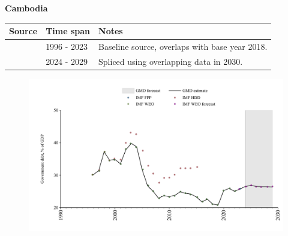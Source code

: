 \documentclass[12pt,a4paper,landscape]{article}
\begin{document}
\begin{adjustbox}{max totalsize={\paperwidth}{\paperheight},center}
\begin{minipage}[t][\textheight][t]{\textwidth}
\vspace*{0.5cm}
{}
\begin{center}
{\Large\bfseries Cambodia}
\end{center}
\vspace{0.5cm}
\begin{table}[H]
\centering
\small
\begin{tabular}{|l|l|l|}
\hline
\textbf{Source} & \textbf{Time span} & \textbf{Notes} \\
\hline
\rowcolor{white}\cite{IMF_FPP}& 1996 - 2023 &Baseline source, overlaps with base year 2018.\\
\rowcolor{lightgray}\cite{IMF_WEO_forecast}& 2024 - 2029 &Spliced using overlapping data in 2030.\\
\hline
\end{tabular}
\end{table}
\begin{figure}[H]
\centering
\includegraphics[width=\textwidth,height=0.6\textheight,keepaspectratio]{graphs/KHM_govdebt_GDP.pdf}
\end{figure}
\end{minipage}
\end{adjustbox}
\end{document}
